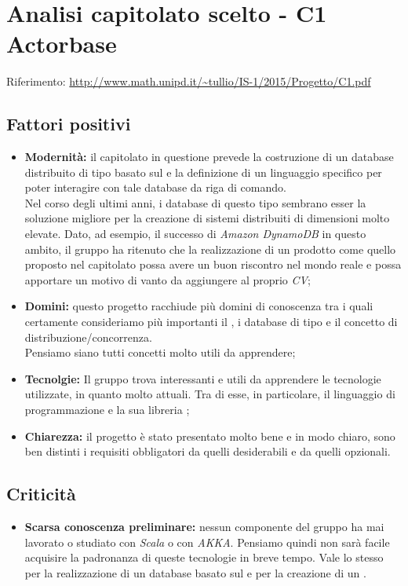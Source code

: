 \documentclass{scalatekids-article}
\begin{document}
\section{Analisi capitolato scelto - C1 Actorbase}
Riferimento: \url{http://www.math.unipd.it/~tullio/IS-1/2015/Progetto/C1.pdf}\\
\subsection{Fattori positivi}
\begin{itemize}
\item \textbf{Modernità:} il capitolato in questione prevede la costruzione di un database  distribuito di tipo  basato sul  e la definizione di un linguaggio specifico per poter interagire con tale database da riga di comando.\\
  Nel corso degli ultimi anni, i database di questo tipo sembrano esser la soluzione migliore per la creazione di sistemi distribuiti di dimensioni molto elevate. Dato, ad esempio, il successo di \textit{Amazon DynamoDB} in questo ambito, il gruppo ha ritenuto che la realizzazione di un prodotto come quello proposto nel capitolato possa avere un buon riscontro nel mondo reale e possa apportare un motivo di vanto da aggiungere al proprio \textit{CV};
\item \textbf{Domini:} questo progetto racchiude più domini di conoscenza tra i quali certamente consideriamo più importanti il , i database  di tipo  e il concetto di distribuzione/concorrenza. \\
  Pensiamo siano tutti concetti molto utili da apprendere;
\item \textbf{Tecnolgie:} Il gruppo trova interessanti e utili da apprendere le tecnologie utilizzate, in quanto molto attuali. Tra di esse, in particolare, il linguaggio di programmazione \textit{} e la sua libreria \textit{};
\item \textbf{Chiarezza:} il progetto è stato presentato molto bene e in modo chiaro, sono ben distinti i requisiti obbligatori da quelli desiderabili e da quelli opzionali.
\end{itemize}
\subsection{Criticità}
\begin{itemize}
\item \textbf{Scarsa conoscenza preliminare:} nessun componente del gruppo ha mai lavorato o studiato con \textit{Scala} o con \textit{AKKA}. Pensiamo quindi non sarà facile acquisire la padronanza di queste tecnologie in breve tempo.
  Vale lo stesso per la realizzazione di un database basato sul  e per la creazione di un .
\end{itemize}
\end{document}
